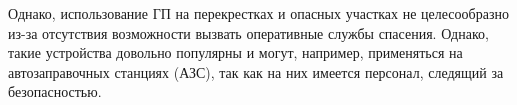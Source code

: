 Однако, использование ГП на перекрестках и опасных участках не целесообразно из-за отсутствия возможности вызвать оперативные службы спасения. Однако, такие устройства довольно популярны и могут, например, применяться на автозаправочных станциях (АЗС), так как на них имеется персонал, следящий за безопасностью. %

